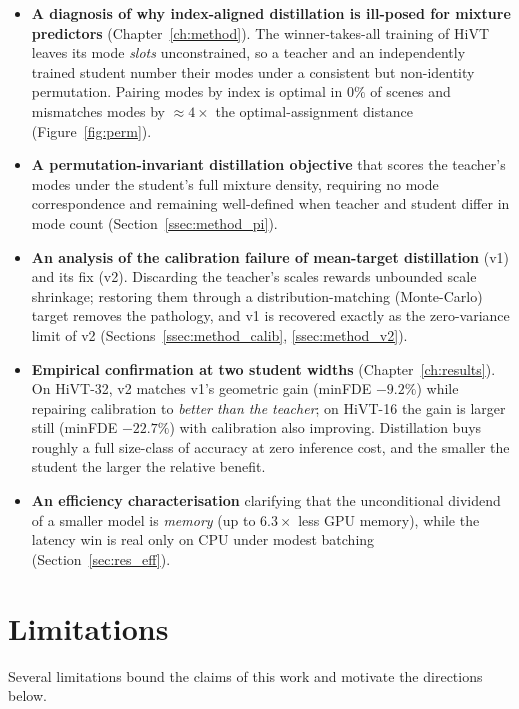 \begin{itemize}[leftmargin=1.4em]
  \item \textbf{A diagnosis of why index-aligned distillation is ill-posed for
        mixture predictors} (Chapter~\ref{ch:method}). The winner-takes-all
        training of HiVT leaves its mode \emph{slots} unconstrained, so a teacher
        and an independently trained student number their modes under a consistent
        but non-identity permutation. Pairing modes by index is optimal in $0\%$ of
        scenes and mismatches modes by $\approx 4\times$ the optimal-assignment
        distance (Figure~\ref{fig:perm}).
  \item \textbf{A permutation-invariant distillation objective} that scores the
        teacher's modes under the student's full mixture density, requiring no mode
        correspondence and remaining well-defined when teacher and student differ in
        mode count (Section~\ref{ssec:method_pi}).
  \item \textbf{An analysis of the calibration failure of mean-target
        distillation} (v1) and its fix (v2). Discarding the teacher's scales rewards
        unbounded scale shrinkage; restoring them through a distribution-matching
        (Monte-Carlo) target removes the pathology, and v1 is recovered exactly as
        the zero-variance limit of v2 (Sections~\ref{ssec:method_calib},
        \ref{ssec:method_v2}).
  \item \textbf{Empirical confirmation at two student widths} (Chapter~\ref{ch:results}).
        On HiVT-32, v2 matches v1's geometric gain (minFDE $-9.2\%$) while repairing
        calibration to \emph{better than the teacher}; on HiVT-16 the gain is larger
        still (minFDE $-22.7\%$) with calibration also improving. Distillation buys
        roughly a full size-class of accuracy at zero inference cost, and the smaller
        the student the larger the relative benefit.
  \item \textbf{An efficiency characterisation} clarifying that the unconditional
        dividend of a smaller model is \emph{memory} (up to $6.3\times$ less GPU
        memory), while the latency win is real only on CPU under modest batching
        (Section~\ref{sec:res_eff}).
\end{itemize}

\section{Limitations}
\label{sec:concl_limits}
Several limitations bound the claims of this work and motivate the directions below.


